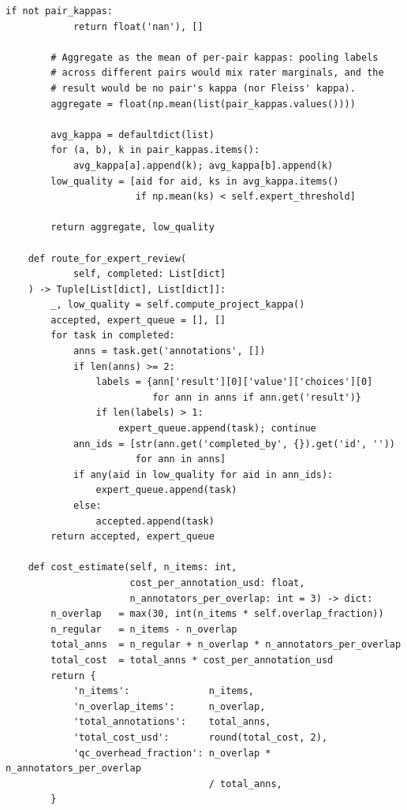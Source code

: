 \begin{lstlisting}[style=python, caption={Production annotation pipeline with quality control}]
        if not pair_kappas:
            return float('nan'), []

        # Aggregate as the mean of per-pair kappas: pooling labels
        # across different pairs would mix rater marginals, and the
        # result would be no pair's kappa (nor Fleiss' kappa).
        aggregate = float(np.mean(list(pair_kappas.values())))

        avg_kappa = defaultdict(list)
        for (a, b), k in pair_kappas.items():
            avg_kappa[a].append(k); avg_kappa[b].append(k)
        low_quality = [aid for aid, ks in avg_kappa.items()
                       if np.mean(ks) < self.expert_threshold]

        return aggregate, low_quality

    def route_for_expert_review(
            self, completed: List[dict]
    ) -> Tuple[List[dict], List[dict]]:
        _, low_quality = self.compute_project_kappa()
        accepted, expert_queue = [], []
        for task in completed:
            anns = task.get('annotations', [])
            if len(anns) >= 2:
                labels = {ann['result'][0]['value']['choices'][0]
                          for ann in anns if ann.get('result')}
                if len(labels) > 1:
                    expert_queue.append(task); continue
            ann_ids = [str(ann.get('completed_by', {}).get('id', ''))
                       for ann in anns]
            if any(aid in low_quality for aid in ann_ids):
                expert_queue.append(task)
            else:
                accepted.append(task)
        return accepted, expert_queue

    def cost_estimate(self, n_items: int,
                      cost_per_annotation_usd: float,
                      n_annotators_per_overlap: int = 3) -> dict:
        n_overlap   = max(30, int(n_items * self.overlap_fraction))
        n_regular   = n_items - n_overlap
        total_anns  = n_regular + n_overlap * n_annotators_per_overlap
        total_cost  = total_anns * cost_per_annotation_usd
        return {
            'n_items':              n_items,
            'n_overlap_items':      n_overlap,
            'total_annotations':    total_anns,
            'total_cost_usd':       round(total_cost, 2),
            'qc_overhead_fraction': n_overlap * n_annotators_per_overlap
                                    / total_anns,
        }
\end{lstlisting}


